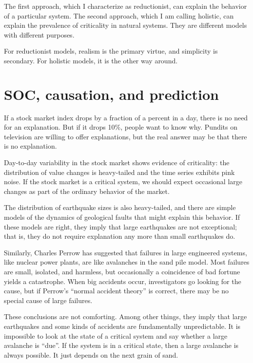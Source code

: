 \documentclass[12pt]{book}
\theoremstyle{exercise}
\begin{document}

The first approach, which I characterize as reductionist, can explain
the behavior of a particular system.  The second approach, which I am calling holistic, can explain the prevalence of criticality in natural systems.  They are different models with different purposes.


For reductionist models, realism is the primary virtue, and simplicity
is secondary.  For holistic models, it is the other way around.


\section{SOC, causation, and prediction}

If a stock market index drops by a fraction of a percent in a
day, there is no need for an explanation.  But if it drops 10\%,
people want to know why.  Pundits
on television are willing to offer explanations, but the real
answer may be that there is no explanation.


Day-to-day variability in the stock market shows evidence of
criticality: the distribution of value changes is heavy-tailed
and the time series exhibits pink noise.
If the stock market is a critical system, we
should expect occasional large changes as part of the ordinary
behavior of the market.

The distribution of earthquake sizes is also heavy-tailed,
and there are simple models of the dynamics of geological faults
that might explain this behavior.  If these models are right,
they imply that large earthquakes are not exceptional; that is,
they do not require explanation any more than small earthquakes do.


Similarly, Charles Perrow has suggested that failures in large
engineered systems, like nuclear power plants, are like avalanches
in the sand pile model.  Most failures are small, isolated, and
harmless, but occasionally a coincidence of bad fortune yields a
catastrophe.  When big accidents occur, investigators go looking for
the cause, but if Perrow's ``normal accident theory'' is correct,
there may be no special cause of large failures.


These conclusions are not comforting.  Among other things, they
imply that large earthquakes and some kinds of accidents are
fundamentally unpredictable.  It is impossible to look at the
state of a critical system and say whether a large avalanche
is ``due''.  If the system is in a critical state, then a large
avalanche is always possible.  It just depends on the
next grain of sand.
\end{document}
